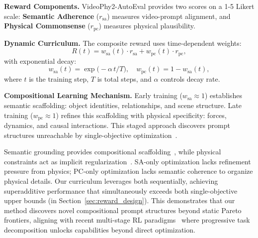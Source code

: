 \noindent\textbf{Reward Components.}
VideoPhy2-AutoEval \cite{bansal2025videophy2} provides two scores on a 1-5 Likert scale: \textbf{Semantic Adherence} ($r_{\text{sa}}$) measures video-prompt alignment, and \textbf{Physical Commonsense} ($r_{\text{pc}}$) measures physical plausibility.

\noindent\textbf{Dynamic Curriculum.}
The composite reward uses time-dependent weights:
\begin{equation}
  R(t) = w_{\text{sa}}(t) \cdot r_{\text{sa}} + w_{\text{pc}}(t) \cdot r_{\text{pc}},
  \label{eq:total_reward}
\end{equation}
with exponential decay:
\begin{equation}
  w_{\text{sa}}(t)=\exp\bigl(-\alpha\,t/T\bigr),\quad
  w_{\text{pc}}(t)=1-w_{\text{sa}}(t),
  \label{eq:weights}
\end{equation}
where $t$ is the training step, $T$ is total steps, and $\alpha$ controls decay rate.

\noindent\textbf{Compositional Learning Mechanism.}
Early training ($w_{\text{sa}} \approx 1$) establishes semantic scaffolding: object identities, relationships, and scene structure. Late training ($w_{\text{pc}} \approx 1$) refines this scaffolding with physical specificity: forces, dynamics, and causal interactions. This staged approach discovers prompt structures unreachable by single-objective optimization~\cite{bengio2009curriculum}.

Semantic grounding provides compositional scaffolding~\cite{scholkopf2021toward}, while physical constraints act as implicit regularization~\cite{liebel2018auxiliary}. SA-only optimization lacks refinement pressure from physics; PC-only optimization lacks semantic coherence to organize physical details. Our curriculum leverages both sequentially, achieving superadditive performance that simultaneously exceeds both single-objective upper bounds (in Section~\ref{sec:reward_design}). This demonstrates that our method discovers novel compositional prompt structures beyond static Pareto frontiers, aligning with recent multi-stage RL paradigms~\cite{guo2025deepseek} where progressive task decomposition unlocks capabilities beyond direct optimization.

